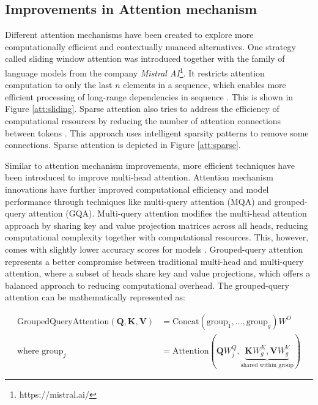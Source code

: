 \subsection{Improvements in Attention mechanism}
Different attention mechanisms have been created to explore more computationally efficient and contextually nuanced alternatives. One strategy called sliding window attention was introduced together with the family of language models from the company \textit{Mistral AI}\footnote{https://mistral.ai/}. It restricts attention computation to only the last $n$ elements in a sequence, which enables more efficient processing of long-range dependencies in sequence \cite{jiang2023mistral}. This is shown in Figure \ref{att:sliding}. Sparse attention also tries to address the efficiency of computational resources by reducing the number of attention connections between tokens \cite{zaheer2020big}. This approach uses intelligent sparsity patterns to remove some connections. Sparse attention is depicted in Figure \ref{att:sparse}.


Similar to attention mechanism improvements, more efficient techniques have been introduced to improve multi-head attention. Attention mechanism innovations have further improved computational efficiency and model performance through techniques like multi-query attention (MQA) and grouped-query attention (GQA). Multi-query attention modifies the multi-head attention approach by sharing key and value projection matrices across all heads, reducing computational complexity together with computational resources. This, however, comes with slightly lower accuracy scores for models \cite{mqa}. Grouped-query attention \cite{kitaev2020reformer} represents a better compromise between traditional multi-head and multi-query attention, where a subset of heads share key and value projections, which offers a balanced approach to reducing computational overhead. The grouped-query attention can be mathematically represented as:


\begin{equation}
\begin{aligned}
\text{GroupedQueryAttention}(\textbf{Q}, \textbf{K}, \textbf{V}) &= \text{Concat}(\text{group}_1, \ldots, \text{group}_g)W^O \\
\text{where } \text{group}_j &= \text{Attention}\left(\textbf{Q}W^Q_j, \underbrace{\textbf{K}W^K_g, \textbf{V}W^V_g}_{\text{shared within group}}\right)
\end{aligned}
\end{equation}

